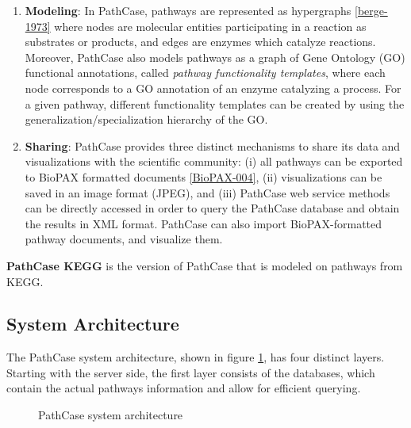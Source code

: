 \begin{enumerate}
    \item \textbf{Modeling}: In PathCase, pathways are represented as
    hypergraphs \ref{berge-1973} where nodes are molecular entities
    participating in a reaction as substrates or products, and edges are enzymes
    which catalyze reactions. Moreover, PathCase also models pathways as a graph
    of Gene Ontology (GO) functional annotations, called \emph{pathway
    functionality templates}, where each node corresponds to a GO annotation of
    an enzyme catalyzing a process. For a given pathway, different functionality
    templates can be created by using the generalization/specialization
    hierarchy of the GO.

    \item \textbf{Sharing}: PathCase provides three distinct mechanisms to share
    its data and visualizations with the scientific community: (i) all pathways
    can be exported to BioPAX formatted documents \ref{BioPAX-004}, (ii)
    visualizations can be saved in an image format (JPEG), and (iii) PathCase
    web service methods can be directly accessed in order to query the PathCase
    database and obtain the results in XML format. PathCase can also import
    BioPAX-formatted pathway documents, and visualize them.

\end{enumerate}

\textbf{PathCase KEGG} is the version of PathCase that is modeled on pathways
from KEGG.

\subsection{System Architecture}
\label{sect:pathcase_architecture}

The PathCase system architecture, shown in figure
\ref{fig:pathcase_architecture}, has four distinct layers. Starting with the
server side, the first layer consists of the databases, which contain the actual
pathways information and allow for efficient querying.

\begin{figure}[hbt]
    \caption{\label{fig:pathcase_architecture} PathCase system architecture}
\end{figure}

